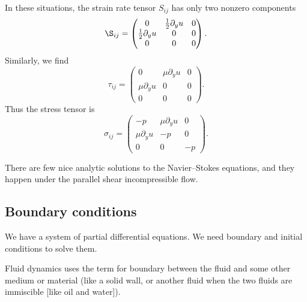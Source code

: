 \begin{node}
In these situations, the strain rate tensor $S_{ij}$ has only two
nonzero components
\begin{equation}
\S_{ij}=\begin{pmatrix}0 & \frac{1}{2}\partial_{y}u & 0\\
\frac{1}{2}\partial_{y}u & 0 & 0\\
0 & 0 & 0
\end{pmatrix}.
\end{equation}
Similarly, we find
\begin{equation}
\tau_{ij} = \begin{pmatrix}0 & \mu\partial_{y}u & 0\\
\mu\partial_{y}u & 0 & 0\\
0 & 0 & 0
\end{pmatrix}.
\end{equation}
Thus the stress tensor is
\begin{equation}
\sigma_{ij} = \begin{pmatrix}-p & \mu\partial_{y}u & 0\\
\mu\partial_{y}u & -p & 0\\
0 & 0 & -p
\end{pmatrix}.
\end{equation}
\end{node}

\begin{remark}
There are few nice analytic solutions to the Navier--Stokes equations,
and they happen under the parallel shear incompressible flow.
\end{remark}

\subsection{Boundary conditions}

\begin{node}
We have a system of partial differential equations. We need boundary
and initial conditions to solve them.
\end{node}

\begin{definition}
Fluid dynamics uses the term  for boundary between
the fluid and some other medium or material (like a solid wall, or
another fluid when the two fluids are immiscible [like oil and water]).
\end{definition}

